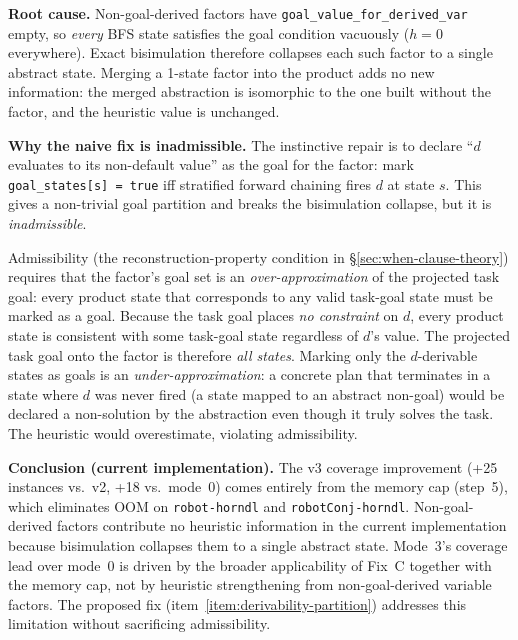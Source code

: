 \documentclass[11pt,a4paper]{article}
\begin{document}
\begin{enumerate}
    \textbf{Root cause.}  Non-goal-derived factors have
    \texttt{goal\_value\_for\_derived\_var} empty, so \emph{every} BFS state
    satisfies the goal condition vacuously ($h = 0$ everywhere).  Exact
    bisimulation therefore collapses each such factor to a single abstract
    state.  Merging a 1-state factor into the product adds no new information:
    the merged abstraction is isomorphic to the one built without the factor,
    and the heuristic value is unchanged.

    \textbf{Why the naive fix is inadmissible.}
    The instinctive repair is to declare ``$d$ evaluates to its non-default
    value'' as the goal for the factor: mark \texttt{goal\_states[s] = true}
    iff stratified forward chaining fires $d$ at state $s$.  This gives a
    non-trivial goal partition and breaks the bisimulation collapse, but it
    is \emph{inadmissible}.

    Admissibility (the reconstruction-property condition in
    \S\ref{sec:when-clause-theory}) requires that the factor's goal set is an
    \emph{over-approximation} of the projected task goal: every product state
    that corresponds to any valid task-goal state must be marked as a goal.
    Because the task goal places \emph{no constraint} on $d$, every product
    state is consistent with some task-goal state regardless of $d$'s value.
    The projected task goal onto the factor is therefore \emph{all states}.
    Marking only the $d$-derivable states as goals is an
    \emph{under-approximation}: a concrete plan that terminates in a state
    where $d$ was never fired (a state mapped to an abstract non-goal) would
    be declared a non-solution by the abstraction even though it truly solves
    the task.  The heuristic would overestimate, violating admissibility.

    \textbf{Conclusion (current implementation).}
    The v3 coverage improvement (+25 instances vs.\ v2, +18 vs.\ mode~0)
    comes entirely from the memory cap (step~5), which eliminates OOM on
    \texttt{robot-horndl} and \texttt{robotConj-horndl}.  Non-goal-derived
    factors contribute no heuristic information in the current implementation
    because bisimulation collapses them to a single abstract state.  Mode~3's
    coverage lead over mode~0 is driven by the broader applicability of Fix~C
    together with the memory cap, not by heuristic strengthening from
    non-goal-derived variable factors.  The proposed fix (item~\ref{item:derivability-partition})
    addresses this limitation without sacrificing admissibility.


\end{enumerate}
\end{document}
